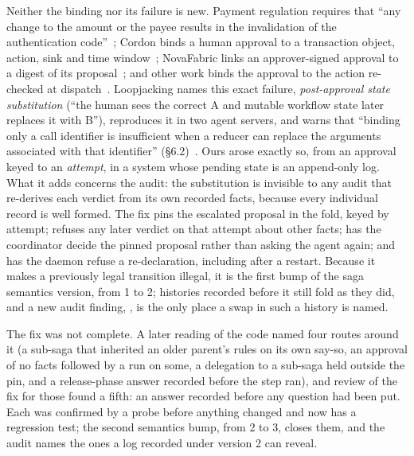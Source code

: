Neither the binding nor its failure is new. Payment regulation requires that
``any change to the amount or the payee results in the invalidation of the
authentication code''~\cite{psd2rts}; Cordon binds a human approval to a
transaction object, action, sink and time window~\cite{cordon}; NovaFabric links
an approver-signed approval to a digest of its proposal~\cite{novafabric}; and
other work binds the approval to the action re-checked at
dispatch~\cite{wyaiwye,actioncard}. Loopjacking names this exact failure,
\emph{post-approval state substitution} (``the human sees the correct A and
mutable workflow state later replaces it with B''), reproduces it in two agent
servers, and warns that ``binding only a call identifier is insufficient when a
reducer can replace the arguments associated with that identifier''
(\S6.2)~\cite{loopjacking}. Ours arose exactly so, from an approval keyed to an
\emph{attempt}, in a system whose pending state is an append-only log. What it adds
concerns the audit: the substitution is invisible to any audit that re-derives
each verdict from its own recorded facts, because every individual record is
well formed. The fix pins the escalated proposal in
the fold, keyed by attempt; refuses any later verdict on that attempt about other
facts; has the coordinator decide the pinned proposal rather than asking the
agent again; and has the daemon refuse a re-declaration, including after a
restart. Because it makes a
previously legal transition illegal, it is the first bump of the saga semantics
version, from 1 to 2; histories recorded before it still fold as they did, and a new audit
finding, , is the only place a swap in such a history is
named.

The fix was not complete. A later reading of the code named four routes around
it (a sub-saga that inherited an older parent's rules on its own say-so, an
approval of no facts followed by a run on some, a delegation to a sub-saga held
outside the pin, and a release-phase answer recorded before the step ran), and
review of the fix for those found a fifth: an answer recorded before any question
had been put. Each was confirmed by a probe before anything changed and now has
a regression test; the second semantics bump, from 2 to 3, closes them, and the
audit names the ones a log recorded under version 2 can reveal.

